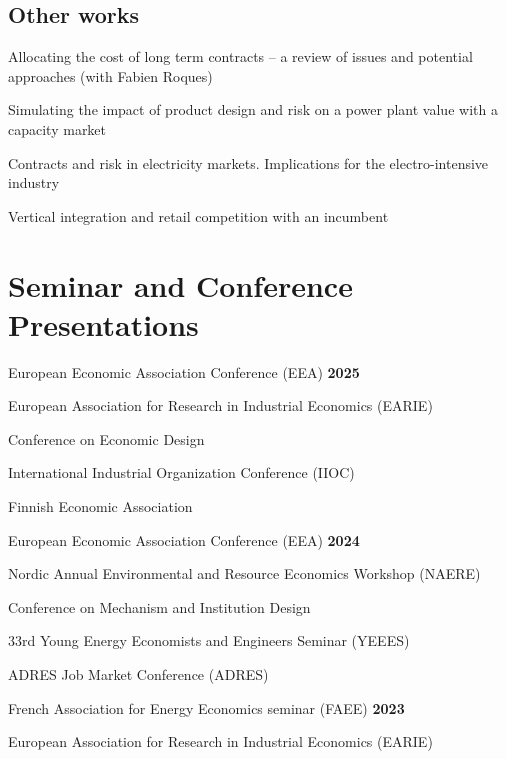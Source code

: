 \documentclass[letterpaper]{article}
\renewenvironment{itemize}{
  \begin{list}{}{
    \setlength{\leftmargin}{1.5em}
  }
}{
  \end{list}
}
\begin{document}
\subsection*{Other works}

\begin{itemize}
\item Allocating the cost of long term contracts – a review of issues and potential approaches (with Fabien Roques)
\item Simulating the impact of product design and risk on a power plant value with a capacity market
\item Contracts and risk in electricity markets. Implications for the electro-intensive industry
\item Vertical integration and retail competition with an incumbent
\end{itemize}


\section*{\textbf{Seminar and Conference Presentations}}
 
 \vspace{0.5\baselineskip}

European Economic Association Conference (EEA) \hfill \hfill \textbf{2025}

European Association for Research in Industrial Economics (EARIE)

Conference on Economic Design

International Industrial Organization Conference (IIOC)

Finnish Economic Association

\vspace{0.5cm}

European Economic Association Conference (EEA) \hfill \hfill \textbf{2024}

Nordic Annual Environmental and Resource Economics Workshop (NAERE)

Conference on Mechanism and Institution Design

33rd Young Energy Economists and Engineers Seminar (YEEES)

ADRES Job Market Conference (ADRES)

\vspace{0.5cm}

French Association for Energy Economics seminar (FAEE) \hfill \hfill \textbf{2023}

European Association for Research in Industrial Economics (EARIE)
\end{document}
